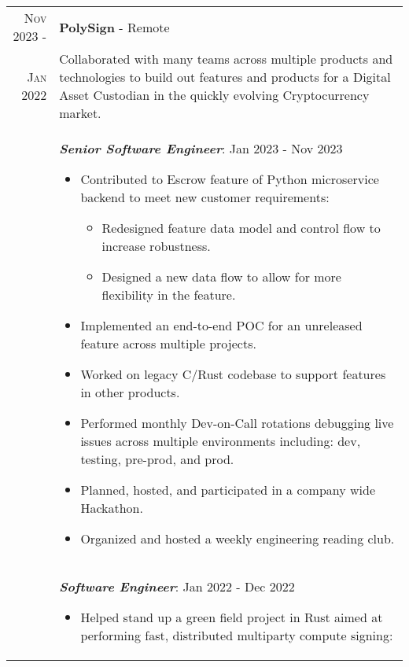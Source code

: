 \documentclass[a4paper,12pt]{article}
\begin{document}
%
%
\begin{tabularx}{\textwidth}{r|X}
   \textsc{Nov 2023 \--} & \textbf{PolySign} \-- Remote \\
   \textsc{Jan 2022} & \small{Collaborated with many teams across multiple products and technologies to build out features and products for a Digital Asset Custodian in the quickly evolving Cryptocurrency market.} \\
   & \emph{\textbf{Senior Software Engineer}}: Jan 2023 \-- Nov 2023
   \begin{itemize}[leftmargin=20pt,topsep=1pt,itemsep=1pt,partopsep=0pt, parsep=1pt]
        \item Contributed to Escrow feature of Python microservice backend to meet new customer requirements:
            \begin{itemize}[leftmargin=20pt,topsep=1pt,itemsep=1pt,partopsep=0pt, parsep=1pt]
              \item Redesigned feature data model and control flow to increase robustness.
              \item Designed a new data flow to allow for more flexibility in the feature.
            \end{itemize}
        \item Implemented an end-to-end POC for an unreleased feature across multiple projects.
        \item Worked on legacy C/Rust codebase to support features in other products.
        \item Performed monthly Dev-on-Call rotations debugging live issues across multiple environments including: dev, testing, pre-prod, and prod.
        \item Planned, hosted, and participated in a company wide Hackathon.
        \item Organized and hosted a weekly engineering reading club.
      \end{itemize}\\
   & \emph{\textbf{Software Engineer}}: Jan 2022 \-- Dec 2022
   \begin{itemize}[leftmargin=20pt,topsep=1pt,itemsep=1pt,partopsep=0pt, parsep=1pt]
        \item Helped stand up a green field project in Rust aimed at performing fast, distributed multiparty compute signing:

\end{itemize}
\end{tabularx}
\end{document}
